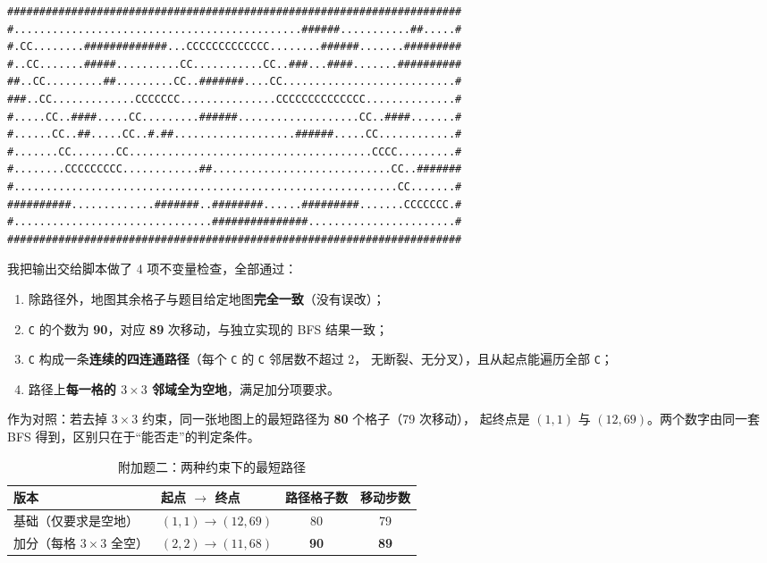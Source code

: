 \begin{lstlisting}[basicstyle=\ttfamily\scriptsize]
#######################################################################
#.............................................######...........##.....#
#.CC........#############...CCCCCCCCCCCCC........######.......#########
#..CC.......#####..........CC...........CC..###...####.......##########
##..CC.........##.........CC..#######....CC...........................#
###..CC.............CCCCCCC...............CCCCCCCCCCCCCC..............#
#.....CC..####.....CC.........######...................CC..####.......#
#......CC..##.....CC..#.##...................######.....CC............#
#.......CC.......CC......................................CCCC.........#
#........CCCCCCCCC............##............................CC..#######
#............................................................CC.......#
##########.............#######..########......#########.......CCCCCCC.#
#...............................###############.......................#
#######################################################################
\end{lstlisting}

我把输出交给脚本做了 4 项不变量检查，全部通过：

\begin{enumerate}
  \item 除路径外，地图其余格子与题目给定地图\textbf{完全一致}（没有误改）；
  \item \texttt{C} 的个数为 \textbf{90}，对应 \textbf{89} 次移动，与独立实现的 BFS 结果一致；
  \item \texttt{C} 构成一条\textbf{连续的四连通路径}（每个 \texttt{C} 的 \texttt{C} 邻居数不超过 2，
        无断裂、无分叉），且从起点能遍历全部 \texttt{C}；
  \item 路径上\textbf{每一格的 $3\times3$ 邻域全为空地}，满足加分项要求。
\end{enumerate}

作为对照：若去掉 $3\times3$ 约束，同一张地图上的最短路径为 \textbf{80} 个格子（79 次移动），
起终点是 $(1,1)$ 与 $(12,69)$。两个数字由同一套 BFS 得到，区别只在于“能否走”的判定条件。

\begin{table}[h]\centering
  \caption{附加题二：两种约束下的最短路径}
  \begin{tabular}{llcc}
    \toprule
    版本 & 起点 $\to$ 终点 & 路径格子数 & 移动步数 \\
    \midrule
    基础（仅要求是空地） & $(1,1) \to (12,69)$ & 80 & 79 \\
    加分（每格 $3\times3$ 全空） & $(2,2) \to (11,68)$ & \textbf{90} & \textbf{89} \\
    \bottomrule
  \end{tabular}
\end{table}
